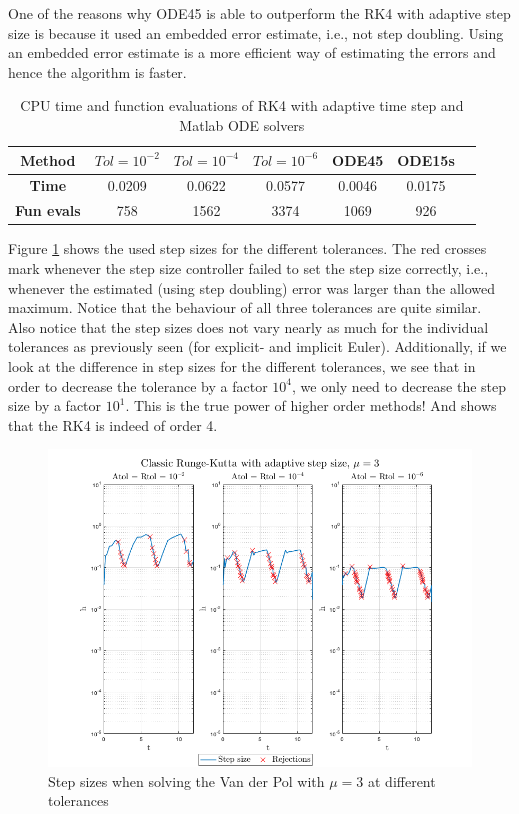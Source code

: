 One of the reasons why ODE45 is able to outperform the RK4 with adaptive step size is because it used an embedded error estimate, i.e., not step doubling. Using an embedded error estimate is a more efficient way of estimating the errors and hence the algorithm is faster.

\begin{table}[H]
    \centering
    \caption{CPU time and function evaluations of RK4 with adaptive time step and Matlab ODE solvers}
    \begin{tabular}{|c||c|c|c|c|c|c|} \hline
         \textbf{Method}    & $Tol = 10^{-2}$&   $Tol = 10^{-4}$ & $Tol = 10^{-6}$ & ODE45 & ODE15s     \\ \hline \hline 
         \textbf{Time}      & 0.0209 &   0.0622 &    0.0577 & 0.0046 & 0.0175   \\ \hline
         \textbf{Fun evals} & 758   &     1562   &     3374 & 1069 & 926  \\ \hline
    \end{tabular}
    \label{tab5:mu3_adap}
\end{table}

Figure \ref{fig5:adap_mu3_h} shows the used step sizes for the different tolerances. The red crosses mark whenever the step size controller failed to set the step size correctly, i.e., whenever the estimated (using step doubling) error was larger than the allowed maximum. Notice that the behaviour of all three tolerances are quite similar. Also notice that the step sizes does not vary nearly as much for the individual tolerances as previously seen (for explicit- and implicit Euler). Additionally, if we look at the difference in step sizes for the different tolerances, we see that in order to decrease the tolerance by a factor $10^4$, we only need to decrease the step size by a factor $10^1$. This is the true power of higher order methods! And shows that the RK4 is indeed of order 4. 

\begin{figure}[H]
    \centering
    \includegraphics[width=\textwidth]{graphics/opg5/mu3_h.png}
    \caption{Step sizes when solving the Van der Pol with $\mu = 3$ at different tolerances}
    \label{fig5:adap_mu3_h}
\end{figure}

